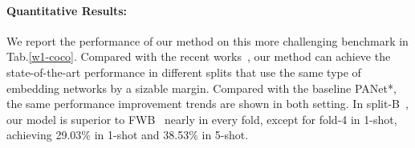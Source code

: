 \documentclass[runningheads]{llncs}
\begin{document}
\begin{table*}[t]
  \center
  \caption{{\small Ablation Studies of 1-way 1-shot on COCO- split-A in every fold. Red numbers denote the averaged mean-IoU over 4 folds.}}
  \label{aba}
\end{table*}


\paragraph{{\rm \textbf{Quantitative Results:}}} 
We report the performance of our method on this more challenging benchmark in Tab.\ref{w1-coco}. Compared with the recent works~\cite{wang2019panet,nguyen2019feature}, our method can achieve  the state-of-the-art performance in different splits that use the same type of embedding networks by a sizable margin. Compared with the baseline PANet*, the same performance improvement trends are shown in both setting. In split-B~\cite{nguyen2019feature}, our model is superior to FWB~\cite{nguyen2019feature} nearly in every fold, except for fold-4 in 1-shot, achieving 29.03\% in 1-shot and 38.53\% in 5-shot.
\end{document}
